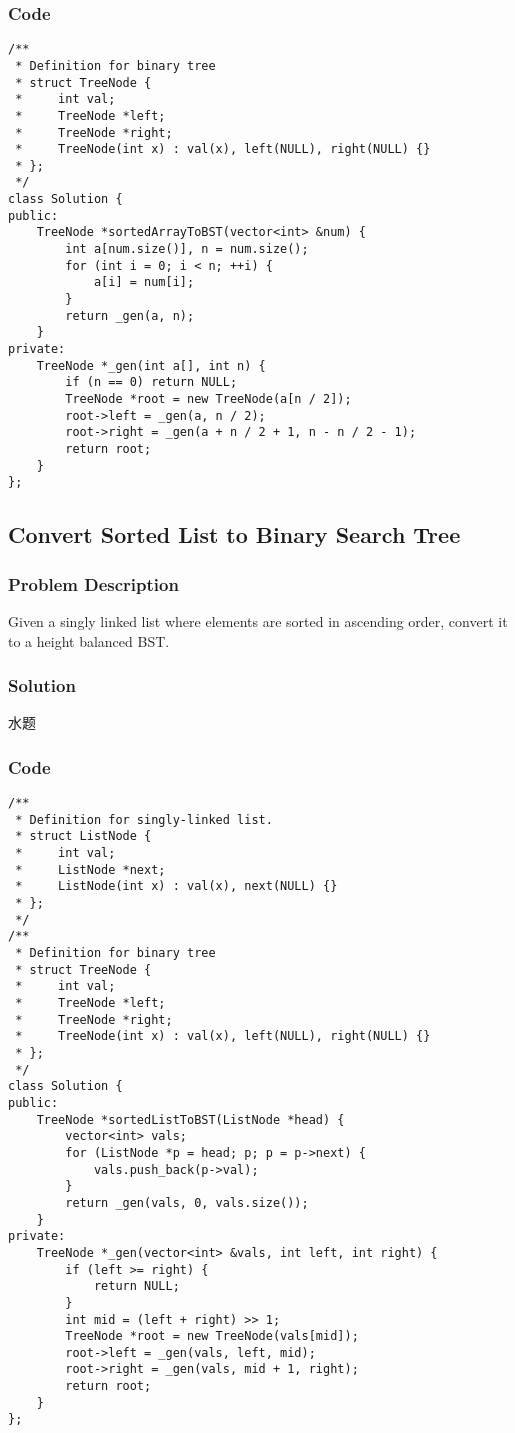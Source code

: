 \documentclass[courier]{article}
\begin{document}
\begin{CJK*}{UTF8}{gkai}
\subsubsection*{Code}
\begin{lstlisting}
/**
 * Definition for binary tree
 * struct TreeNode {
 *     int val;
 *     TreeNode *left;
 *     TreeNode *right;
 *     TreeNode(int x) : val(x), left(NULL), right(NULL) {}
 * };
 */
class Solution {
public:
    TreeNode *sortedArrayToBST(vector<int> &num) {
        int a[num.size()], n = num.size();
        for (int i = 0; i < n; ++i) {
            a[i] = num[i];
        }
        return _gen(a, n);
    }
private:
    TreeNode *_gen(int a[], int n) {
        if (n == 0) return NULL;
        TreeNode *root = new TreeNode(a[n / 2]);
        root->left = _gen(a, n / 2);
        root->right = _gen(a + n / 2 + 1, n - n / 2 - 1);
        return root;
    }
}; 
\end{lstlisting}


\subsection{ Convert Sorted List to Binary Search Tree }

\subsubsection*{Problem Description}
Given a singly linked list where elements are sorted in ascending order, convert it to a height balanced BST.



\subsubsection*{Solution}
水题

\subsubsection*{Code}
\begin{lstlisting}
/**
 * Definition for singly-linked list.
 * struct ListNode {
 *     int val;
 *     ListNode *next;
 *     ListNode(int x) : val(x), next(NULL) {}
 * };
 */
/**
 * Definition for binary tree
 * struct TreeNode {
 *     int val;
 *     TreeNode *left;
 *     TreeNode *right;
 *     TreeNode(int x) : val(x), left(NULL), right(NULL) {}
 * };
 */
class Solution {
public:
    TreeNode *sortedListToBST(ListNode *head) {
        vector<int> vals;
        for (ListNode *p = head; p; p = p->next) {
            vals.push_back(p->val);
        }
        return _gen(vals, 0, vals.size());
    }
private:
    TreeNode *_gen(vector<int> &vals, int left, int right) {
        if (left >= right) {
            return NULL;
        }
        int mid = (left + right) >> 1;
        TreeNode *root = new TreeNode(vals[mid]);
        root->left = _gen(vals, left, mid);
        root->right = _gen(vals, mid + 1, right);
        return root;
    }
}; 
\end{lstlisting}



\end{CJK*}
\end{document}
